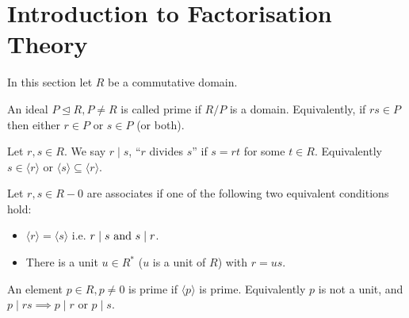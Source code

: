 \section{Introduction to Factorisation Theory}

In this section let \(R\) be a commutative domain.

\begin{definition}
    An ideal \(P \trianglelefteq R, P \neq R\) is called prime if \(R / P\) is a domain. Equivalently, if \(rs \in P\) then either \(r \in P\) or \(s \in P\) (or both).
\end{definition}


\begin{definition}[Divsibility]
    Let \(r, s \in R\). We say \(r \mid s\), ``\(r\) divides \(s\)'' if \(s = rt\) for some \(t \in R\). Equivalently \(s \in \langle r \rangle\) or \(\langle s \rangle \subseteq \langle r \rangle\).
\end{definition}


\begin{definition}[Associates]
    Let \(r, s \in R - 0\) are associates if one of the following two equivalent conditions hold:
    \begin{itemize}
        \item \(\langle r \rangle = \langle s \rangle\) i.e. \(r \mid s \text{ and } s \mid r\).
        \item There is a unit \(u \in R^*\) (\(u\) is a unit of \(R\)) with \(r = us\).
    \end{itemize}
\end{definition}

\begin{definition}[Primes]
    An element \(p \in R, p \neq 0\) is prime if \(\langle p \rangle\) is prime. Equivalently \(p\) is not a unit, and \(p \mid rs \implies p \mid r\) or \(p \mid s\).
\end{definition}

